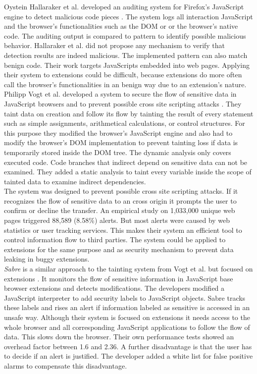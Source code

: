 \documentclass[article,colorback,accentcolor=tud9c,type=bsc]{tudthesis}
\begin{document}
	Oystein Hallaraker et al. developed an auditing system for Firefox's JavaScript engine to detect malicious code pieces \cite{Hallaraker:2005:DMJ:1078029.1078861}. The system logs all interaction JavaScript and the browser's functionalities such as the DOM or or the browser's native code. The auditing output is compared to pattern to identify possible malicious behavior. Hallaraker et al. did not propose any mechanism to verify that detection results are indeed malicious. The implemented pattern can also match benign code. Their work targets JavaScripts embedded into web pages. Applying their system to extensions could be difficult, because extensions do more often call the browser's functionalities in an benign way due to an extension's nature. \\
	
	Philipp Vogt et al. developed a system to secure the flow of sensitive data in JavaScript browsers and to prevent possible cross site scripting attacks \cite{ndss2007xss} . They taint data on creation and follow its flow by tainting the result of every statement such as simple assignments, arithmetical calculations, or control structures. For this purpose they modified the browser's JavaScript engine and also had to modify the browser's DOM implementation to prevent tainting loss if data is temporarily stored inside the DOM tree. The dynamic analysis only covers executed code. Code branches that indirect depend on sensitive data can not be examined. They added a static analysis to taint every variable inside the scope of tainted data to examine indirect dependencies. \\
	The system was designed to prevent possible cross site scripting attacks. If it recognizes the flow of sensitive data to an cross origin it prompts the user to confirm or decline the transfer. An empirical study on 1,033,000 unique web pages triggered 88,589 (8.58\%) alerts. But most alerts were caused by web statistics or user tracking services. This makes their system an efficient tool to control information flow to third parties. The system could be applied to extensions for the same purpose and as security mechanism to prevent data leaking in buggy extensions. \\
	
	\textit{Sabre} is a similar approach to the tainting system from Vogt et al. but focused on extensions \cite{Dhawan:2009:AIF:1723192.1723250, ndss2007xss}. It monitors the flow of sensitive information in JavaScript base browser extensions and detects modifications. The developers modified a JavaScript interpreter to add security labels to JavaScript objects. Sabre tracks these labels and rises an alert if information labeled as sensitive is accessed in an unsafe way. Although their system is focused on extensions it needs access to the whole browser and all corresponding JavaScript applications to follow the flow of data. This slows down the browser. Their own performance tests showed an overhead factor between 1.6 and 2.36. A further disadvantage is that the user has to decide if an alert is justified. The developer added a white list for false positive alarms to compensate this disadvantage.  
	
\end{document}

